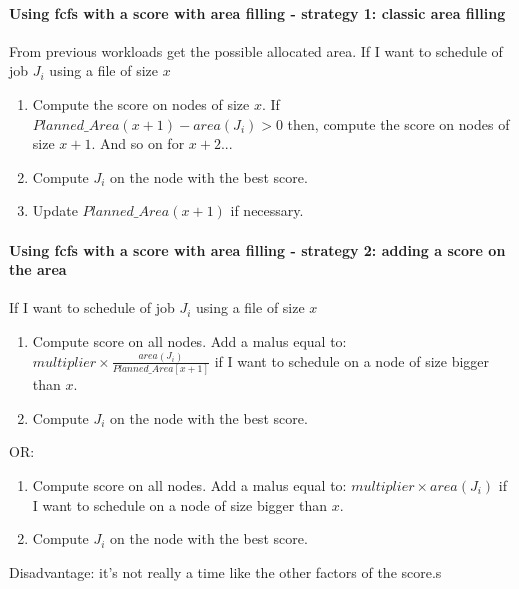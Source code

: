 \documentclass[a4paper]{article}
\begin{document}
\paragraph{Using fcfs with a score with area filling - strategy 1: classic area filling}
From previous workloads get the possible allocated area.
If I want to schedule of job $J_i$ using a file of size $x$
\begin{enumerate}
	\item Compute the score on nodes of size $x$. If $Planned\_Area(x+1) - area(J_i) > 0$ then, compute the score on nodes of size $x+1$. And so on for $x+2$...
	\item Compute $J_i$ on the node with the best score.
	\item Update $Planned\_Area(x+1)$ if necessary.
\end{enumerate}

\paragraph{Using fcfs with a score with area filling - strategy 2: adding a score on the area}
If I want to schedule of job $J_i$ using a file of size $x$
\begin{enumerate}
	\item Compute score on all nodes. Add a malus equal to: $multiplier \times \frac{area(J_i)}{Planned\_Area[x+1]}$ if I want to schedule on a node of size bigger than $x$.
	\item Compute $J_i$ on the node with the best score.
\end{enumerate}
OR:
\begin{enumerate}
	\item Compute score on all nodes. Add a malus equal to: $multiplier \times area(J_i)$ if I want to schedule on a node of size bigger than $x$.
	\item Compute $J_i$ on the node with the best score.
\end{enumerate}
Disadvantage: it's not really a time like the other factors of the score.s
\end{document}
